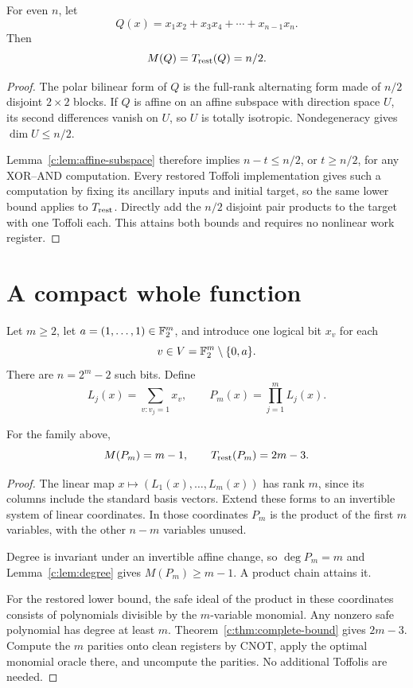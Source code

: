 \begin{proposition}\label{c:prop:quadratic-cost}
For even $n$, let
\[
 Q(x)=x_1x_2+x_3x_4+\cdots+x_{n-1}x_n.
\]
Then
\[
 M(Q)=T_{\mathrm{rest}}(Q)=n/2.
\]
\end{proposition}
\begin{proof}
The polar bilinear form of $Q$ is the full-rank alternating form made of $n/2$ disjoint $2\times2$ blocks. If $Q$ is affine on an affine subspace with direction space $U$, its second differences vanish on $U$, so $U$ is totally isotropic. Nondegeneracy gives $\dim U\le n/2$.

Lemma~\ref{c:lem:affine-subspace} therefore implies $n-t\le n/2$, or $t\ge n/2$, for any XOR--AND computation. Every restored Toffoli implementation gives such a computation by fixing its ancillary inputs and initial target, so the same lower bound applies to $T_{\mathrm{rest}}$. Directly add the $n/2$ disjoint pair products to the target with one Toffoli each. This attains both bounds and requires no nonlinear work register.
\end{proof}

\section{A compact whole function}
Let $m\ge2$, let $a=(1,\ldots,1)\in\mathbb F_2^m$, and introduce one logical bit $x_v$ for each
\[
 v\in V=\mathbb F_2^m\setminus\{0,a\}.
\]
There are $n=2^m-2$ such bits. Define
\[
 L_j(x)=\sum_{v:v_j=1}x_v,\qquad
 P_m(x)=\prod_{j=1}^mL_j(x).
\]

\begin{theorem}\label{c:thm:whole-cost}
For the family above,
\[
 M(P_m)=m-1,\qquad T_{\mathrm{rest}}(P_m)=2m-3.
\]
\end{theorem}
\begin{proof}
The linear map $x\mapsto(L_1(x),\ldots,L_m(x))$ has rank $m$, since its columns include the standard basis vectors. Extend these forms to an invertible system of linear coordinates. In those coordinates $P_m$ is the product of the first $m$ variables, with the other $n-m$ variables unused.

Degree is invariant under an invertible affine change, so $\deg P_m=m$ and Lemma~\ref{c:lem:degree} gives $M(P_m)\ge m-1$. A product chain attains it.

For the restored lower bound, the safe ideal of the product in these coordinates consists of polynomials divisible by the $m$-variable monomial. Any nonzero safe polynomial has degree at least $m$. Theorem~\ref{c:thm:complete-bound} gives $2m-3$. Compute the $m$ parities onto clean registers by CNOT, apply the optimal monomial oracle there, and uncompute the parities. No additional Toffolis are needed.
\end{proof}

